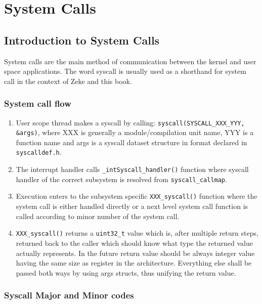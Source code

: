 \part{System Calls}

\chapter{Introduction to System Calls}

System calls are the main method of communication between the kernel and user
space applications. The word syscall is usually used as a shorthand for system
call in the context of Zeke and this book.

\section{System call flow}

\begin{enumerate}
\item User scope thread makes a syscall by calling:
      \verb+syscall(SYSCALL_XXX_YYY, &args)+, where XXX is generally a
      module/compilation unit name, YYY is a function name and args is a
      syscall dataset structure in format declared in \verb+syscalldef.h+.

\item The interrupt handler calls \verb+_intSyscall_handler()+ function where
      syscall handler of the correct subsystem is resolved from
      \verb+syscall_callmap+.

\item Execution enters to the subsystem specific \verb+XXX_syscall()+
      function where the system call is either handled directly or a next level
      system call function is called according to minor number of
      the system call.

\item \verb+XXX_syscall()+ returns a \verb+uint32_t+ value which is, after
      multiple return steps, returned back to the caller which should know
      what type the returned value actually represents. In the future return
      value should be always integer value having the same size as register
      in the architecture. Everything else shall be passed both ways by using
      args structs, thus unifying the return value.
\end{enumerate}

\section{Syscall Major and Minor codes}

